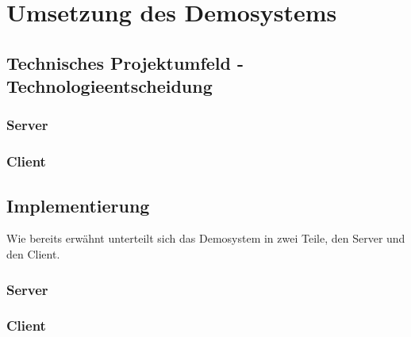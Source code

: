 \section{Umsetzung des Demosystems}
\subsection{Technisches Projektumfeld - Technologieentscheidung}
\subsubsection{Server}
\subsubsection{Client}

\subsection{Implementierung}
Wie bereits erwähnt unterteilt sich das Demosystem in zwei Teile, den Server und den Client.

\subsubsection{Server}
\subsubsection{Client}